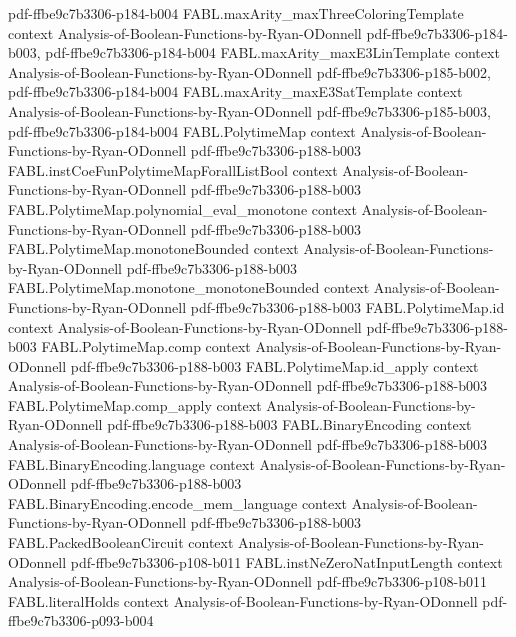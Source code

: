 \begin{theorem}
{    pdf-ffbe9c7b3306-p184-b004}
\proofstep
  {FABL.maxArity_maxThreeColoringTemplate}
  {context}
  {Analysis-of-Boolean-Functions-by-Ryan-ODonnell}
  {pdf-ffbe9c7b3306-p184-b003,
    pdf-ffbe9c7b3306-p184-b004}
\proofstep
  {FABL.maxArity_maxE3LinTemplate}
  {context}
  {Analysis-of-Boolean-Functions-by-Ryan-ODonnell}
  {pdf-ffbe9c7b3306-p185-b002,
    pdf-ffbe9c7b3306-p184-b004}
\proofstep
  {FABL.maxArity_maxE3SatTemplate}
  {context}
  {Analysis-of-Boolean-Functions-by-Ryan-ODonnell}
  {pdf-ffbe9c7b3306-p185-b003,
    pdf-ffbe9c7b3306-p184-b004}
\proofstep
  {FABL.PolytimeMap}
  {context}
  {Analysis-of-Boolean-Functions-by-Ryan-ODonnell}
  {pdf-ffbe9c7b3306-p188-b003}
\proofstep
  {FABL.instCoeFunPolytimeMapForallListBool}
  {context}
  {Analysis-of-Boolean-Functions-by-Ryan-ODonnell}
  {pdf-ffbe9c7b3306-p188-b003}
\proofstep
  {FABL.PolytimeMap.polynomial_eval_monotone}
  {context}
  {Analysis-of-Boolean-Functions-by-Ryan-ODonnell}
  {pdf-ffbe9c7b3306-p188-b003}
\proofstep
  {FABL.PolytimeMap.monotoneBounded}
  {context}
  {Analysis-of-Boolean-Functions-by-Ryan-ODonnell}
  {pdf-ffbe9c7b3306-p188-b003}
\proofstep
  {FABL.PolytimeMap.monotone_monotoneBounded}
  {context}
  {Analysis-of-Boolean-Functions-by-Ryan-ODonnell}
  {pdf-ffbe9c7b3306-p188-b003}
\proofstep
  {FABL.PolytimeMap.id}
  {context}
  {Analysis-of-Boolean-Functions-by-Ryan-ODonnell}
  {pdf-ffbe9c7b3306-p188-b003}
\proofstep
  {FABL.PolytimeMap.comp}
  {context}
  {Analysis-of-Boolean-Functions-by-Ryan-ODonnell}
  {pdf-ffbe9c7b3306-p188-b003}
\proofstep
  {FABL.PolytimeMap.id_apply}
  {context}
  {Analysis-of-Boolean-Functions-by-Ryan-ODonnell}
  {pdf-ffbe9c7b3306-p188-b003}
\proofstep
  {FABL.PolytimeMap.comp_apply}
  {context}
  {Analysis-of-Boolean-Functions-by-Ryan-ODonnell}
  {pdf-ffbe9c7b3306-p188-b003}
\proofstep
  {FABL.BinaryEncoding}
  {context}
  {Analysis-of-Boolean-Functions-by-Ryan-ODonnell}
  {pdf-ffbe9c7b3306-p188-b003}
\proofstep
  {FABL.BinaryEncoding.language}
  {context}
  {Analysis-of-Boolean-Functions-by-Ryan-ODonnell}
  {pdf-ffbe9c7b3306-p188-b003}
\proofstep
  {FABL.BinaryEncoding.encode_mem_language}
  {context}
  {Analysis-of-Boolean-Functions-by-Ryan-ODonnell}
  {pdf-ffbe9c7b3306-p188-b003}
\proofstep
  {FABL.PackedBooleanCircuit}
  {context}
  {Analysis-of-Boolean-Functions-by-Ryan-ODonnell}
  {pdf-ffbe9c7b3306-p108-b011}
\proofstep
  {FABL.instNeZeroNatInputLength}
  {context}
  {Analysis-of-Boolean-Functions-by-Ryan-ODonnell}
  {pdf-ffbe9c7b3306-p108-b011}
\proofstep
  {FABL.literalHolds}
  {context}
  {Analysis-of-Boolean-Functions-by-Ryan-ODonnell}
  {pdf-ffbe9c7b3306-p093-b004}

\end{theorem}
